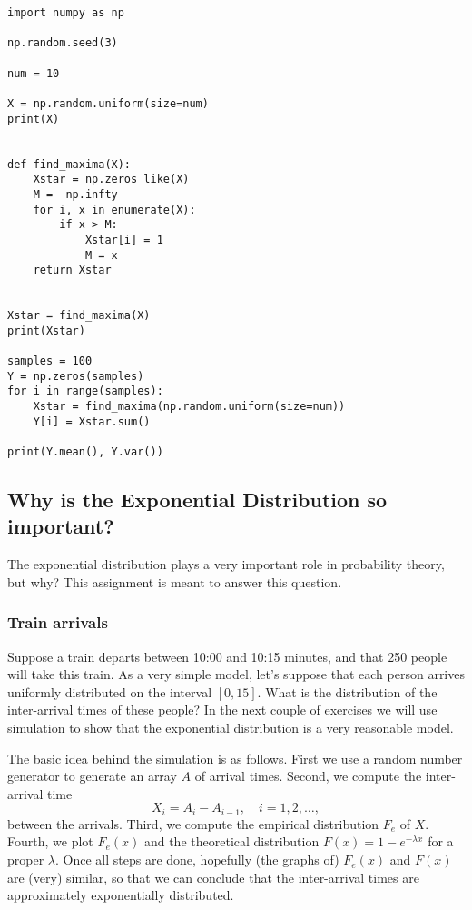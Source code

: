 \documentclass[a4paper]{article}
\begin{document}
\begin{verbatim}
import numpy as np

np.random.seed(3)

num = 10

X = np.random.uniform(size=num)
print(X)


def find_maxima(X):
    Xstar = np.zeros_like(X)
    M = -np.infty
    for i, x in enumerate(X):
        if x > M:
            Xstar[i] = 1
            M = x
    return Xstar


Xstar = find_maxima(X)
print(Xstar)

samples = 100
Y = np.zeros(samples)
for i in range(samples):
    Xstar = find_maxima(np.random.uniform(size=num))
    Y[i] = Xstar.sum()

print(Y.mean(), Y.var())
\end{verbatim}





\subsection{Why is the Exponential Distribution so important?}
\label{sec:org50b29b7}

The exponential distribution plays a very important role in probability theory, but why? This assignment is meant to answer this question.  

\subsubsection{Train arrivals}
\label{sec:org25e266e}

Suppose a train departs between 10:00 and 10:15 minutes, and that 250 people will take this train.
As a very simple model, let's suppose that each person arrives uniformly distributed on the interval \([0,15]\).
What is the distribution of the inter-arrival times of these people?
In the next couple of exercises we will use simulation to show that the exponential distribution is a very reasonable model.

The basic idea behind the simulation is as follows. First we use a random number generator to generate an array \(A\) of arrival times. Second, we compute the inter-arrival time
\begin{equation}
\label{eq:1}
X_{i} = A_{i} - A_{i-1},\quad i = 1,2, \ldots,
\end{equation}
between the arrivals.
Third, we compute the empirical distribution \(F_{e}\) of \(X\).
Fourth, we plot  \(F_{e}(x)\) and  the theoretical distribution \(F(x) = 1-e^{-\lambda x}\) for a proper \(\lambda\). 
Once all steps are done, hopefully (the graphs of) \(F_{e}(x)\) and \(F(x)\) are (very) similar, so that we can conclude that the inter-arrival times are approximately exponentially distributed. 
\end{document}
